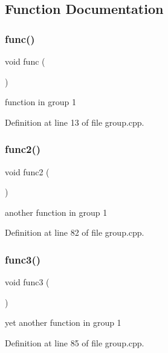 \subsection{Function Documentation}
\mbox{\label{group__group1_ga24f647174760cac13d2624b5ad74b00c}} 
\subsubsection{\texorpdfstring{func()}{func()}}
{\footnotesize\ttfamily void func (\begin{DoxyParamCaption}{ }\end{DoxyParamCaption})}

function in group 1 

Definition at line 13 of file group.\+cpp.

\mbox{\label{group__group1_ga053929c0809a5f56f7548fd7d9968f31}} 
\subsubsection{\texorpdfstring{func2()}{func2()}}
{\footnotesize\ttfamily void func2 (\begin{DoxyParamCaption}{ }\end{DoxyParamCaption})}

another function in group 1 

Definition at line 82 of file group.\+cpp.

\mbox{\label{group__group1_gadbf675591ff057ec48ce35b0d5cdf755}} 
\subsubsection{\texorpdfstring{func3()}{func3()}}
{\footnotesize\ttfamily void func3 (\begin{DoxyParamCaption}{ }\end{DoxyParamCaption})}

yet another function in group 1 

Definition at line 85 of file group.\+cpp.

